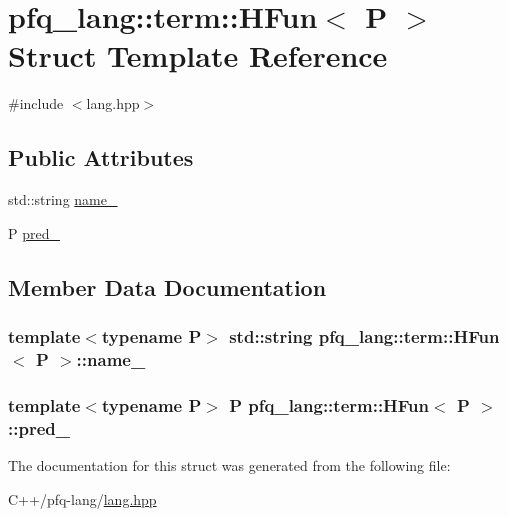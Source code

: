 \hypertarget{structpfq__lang_1_1term_1_1HFun}{\section{pfq\-\_\-lang\-:\-:term\-:\-:H\-Fun$<$ P $>$ Struct Template Reference}
\label{structpfq__lang_1_1term_1_1HFun}
}


{\ttfamily \#include $<$lang.\-hpp$>$}

\subsection*{Public Attributes}
\begin{DoxyCompactItemize}
\item 
std\-::string \hyperlink{structpfq__lang_1_1term_1_1HFun_ae20ef1dda67f36ac1d73bde9eb7ffece}{name\-\_\-}
\item 
P \hyperlink{structpfq__lang_1_1term_1_1HFun_a21b242e11fd7818e6e7c1242433951db}{pred\-\_\-}
\end{DoxyCompactItemize}


\subsection{Member Data Documentation}
\hypertarget{structpfq__lang_1_1term_1_1HFun_ae20ef1dda67f36ac1d73bde9eb7ffece}{
\subsubsection[{name\-\_\-}]{\setlength{\rightskip}{0pt plus 5cm}template$<$typename P$>$ std\-::string {\bf pfq\-\_\-lang\-::term\-::\-H\-Fun}$<$ P $>$\-::name\-\_\-}}\label{structpfq__lang_1_1term_1_1HFun_ae20ef1dda67f36ac1d73bde9eb7ffece}
\hypertarget{structpfq__lang_1_1term_1_1HFun_a21b242e11fd7818e6e7c1242433951db}{
\subsubsection[{pred\-\_\-}]{\setlength{\rightskip}{0pt plus 5cm}template$<$typename P$>$ P {\bf pfq\-\_\-lang\-::term\-::\-H\-Fun}$<$ P $>$\-::pred\-\_\-}}\label{structpfq__lang_1_1term_1_1HFun_a21b242e11fd7818e6e7c1242433951db}


The documentation for this struct was generated from the following file\-:\begin{DoxyCompactItemize}
\item 
C++/pfq-\/lang/\hyperlink{lang_8hpp}{lang.\-hpp}\end{DoxyCompactItemize}
